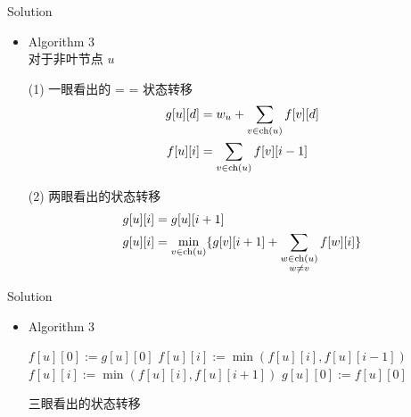 \documentclass[UTF8]{beamer}
\begin{document}
\begin{frame}{Solution}

\begin{itemize}
    \item Algorithm 3 \\
        对于非叶节点 $u$

        (1) 一眼看出的 = = 状态转移
        \begin{equation*}\begin{split}
            g[u][d] &= w_u + \sum_{v \in {\rm ch}(u)} f[v][d] \\
            f[u][i] &= \sum_{v \in {\rm ch}(u)} f[v][i - 1]
        \end{split}\end{equation*}

        \pause
        (2) 两眼看出的状态转移
        \begin{equation*}\begin{split}
            g[u][i] &= g[u][i + 1] \\
            g[u][i] &= \min_{v \in {\rm ch}(u)}
                \{g[v][i + 1] + \sum_{\substack{w \in {\rm ch}(u) \\ w \neq v}} f[w][i]\} \\
        \end{split}\end{equation*}
\end{itemize}

\end{frame}

\begin{frame}{Solution}

\begin{itemize}
    \item Algorithm 3 \\
        \begin{algorithm}[H]
        \begin{algorithmic}[1]
            \STATE $f[u][0] := g[u][0]$
                \STATE $f[u][i] := \min(f[u][i], f[u][i - 1])$
            \ENDFOR
                    \STATE $f[u][i] := \min(f[u][i], f[u][i + 1])$
                \ENDIF
            \ENDFOR
            \STATE $g[u][0] := f[u][0]$
        \end{algorithmic}
        \caption{三眼看出的状态转移}
        \label{alg:seq}
        \end{algorithm}
\end{itemize}

\end{frame}
\end{document}
